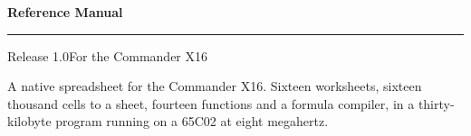 \thispagestyle{empty}
\ccthumbfalse

\begin{center}

\vspace*{0.55in}

\cclogo[4.55in]

\vspace{0.62in}

{\sffamily\bfseries\fontsize{30}{34}\selectfont Reference Manual}

\vspace{12pt}

\rule{4.55in}{2.5pt}

\vspace{16pt}

{\sffamily\fontsize{11.5}{14}\selectfont
 Release 1.0\quad\textbullet\quad For the Commander X16}

\vfill

\begin{minipage}{4.2in}
\centering\fontsize{9.5}{13}\selectfont
A native spreadsheet for the Commander X16. Sixteen worksheets, sixteen
thousand cells to a sheet, fourteen functions and a formula compiler, in a
thirty-kilobyte program running on a 65C02 at eight megahertz.
\end{minipage}

\vspace{0.5in}

{\ccmark[0.52in]}

\vspace{0.45in}

\end{center}

\clearpage
